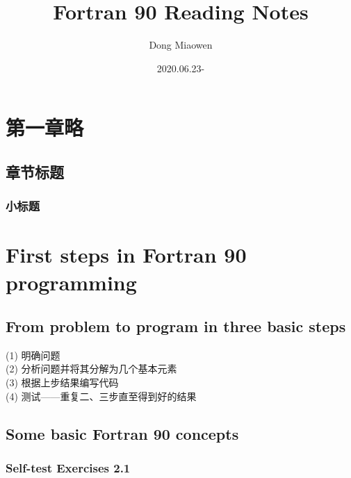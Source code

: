 \documentclass[a4paper,titlepage]{report}
\title{Fortran 90 Reading Notes}
\author{Dong Miaowen}
\date{2020.06.23-}
\begin{document}
\maketitle

\tableofcontents{}

\chapter{第一章略}

\section{章节标题}

\subsection{小标题}


\chapter{First steps in Fortran 90 programming}

\section{From problem to program in three basic steps}

(1) 明确问题 \\
(2) 分析问题并将其分解为几个基本元素 \\
(3) 根据上步结果编写代码 \\
(4) 测试——重复二、三步直至得到好的结果 \\

\section{Some basic Fortran 90 concepts}

\subsection*{Self-test Exercises 2.1}
\end{document}
